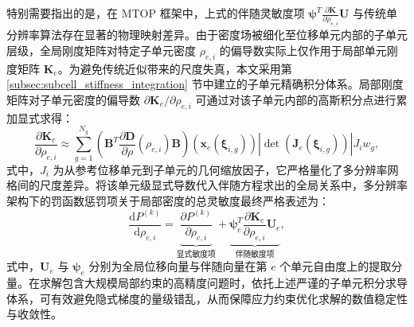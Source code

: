 特别需要指出的是，在 MTOP 框架中，上式的伴随灵敏度项 $\boldsymbol{\psi}^T \frac{\partial \boldsymbol{K}}{\partial\rho_{e,i}} \boldsymbol{U}$ 与传统单分辨率算法存在显著的物理映射差异。由于密度场被细化至位移单元内部的子单元层级，全局刚度矩阵对特定子单元密度 $\rho_{e,i}$ 的偏导数实际上仅作用于局部单元刚度矩阵 $\boldsymbol{K}_e$。为避免传统近似带来的尺度失真，本文采用第 \ref{subsec:subcell_stiffness_integration} 节中建立的子单元精确积分体系。局部刚度矩阵对子单元密度的偏导数 $\partial \boldsymbol{K}_e / \partial\rho_{e,i}$ 可通过对该子单元内部的高斯积分点进行累加显式求得：
\[
\frac{\partial \boldsymbol{K}_e}{\partial \rho_{e,i}} \approx \sum_{g=1}^{N_g} \left( \boldsymbol{B}^T \frac{\partial \boldsymbol{D}}{\partial \rho}(\rho_{e,i}) \boldsymbol{B} \right)(\boldsymbol{x}_e(\boldsymbol\xi_{i,g})) |\det(\boldsymbol{J}_e(\boldsymbol\xi_{i,g}))|J_iw_g,
\]
式中，$J_i$ 为从参考位移单元到子单元的几何缩放因子，它严格量化了多分辨率网格间的尺度差异。将该单元级显式导数代入伴随方程求出的全局关系中，多分辨率架构下的罚函数惩罚项关于局部密度的总灵敏度最终严格表述为：
\begin{equation} \label{eq:ch4_total_sensitivity}
	\frac{\mathrm{d}P^{(k)}}{\mathrm{d}\rho_{e,i}} = \underbrace{\frac{\partial P^{(k)}}{\partial\rho_{e,i}}}_{\text{显式敏度项}} + \underbrace{\boldsymbol{\psi}_e^T \frac{\partial \boldsymbol{K}_e}{\partial\rho_{e,i}} \boldsymbol{U}_e}_{\text{伴随敏度项}},
\end{equation}
式中，$\boldsymbol{U}_e$ 与 $\boldsymbol{\psi}_e$ 分别为全局位移向量与伴随向量在第 $e$ 个单元自由度上的提取分量。在求解包含大规模局部约束的高精度问题时，依托上述严谨的子单元积分求导体系，可有效避免隐式梯度的量级错乱，从而保障应力约束优化求解的数值稳定性与收敛性。

